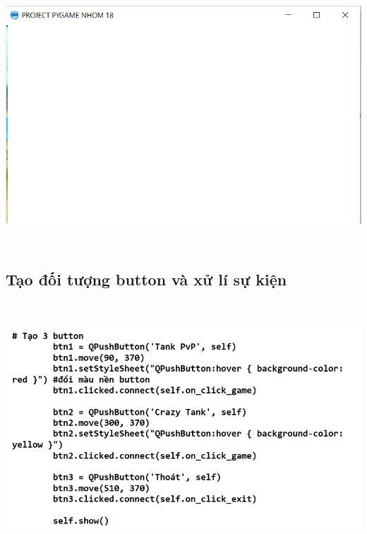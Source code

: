 \documentclass[a4paper]{article}
\begin{document}
\includegraphics[width=6.3in,height=3.85833in]{image2.png}\\
	
\subsection{Tạo đối tượng button và xử lí sự kiện}
\includegraphics[width=6in,height=3.7in]{image1_3.png}
\end{document}
